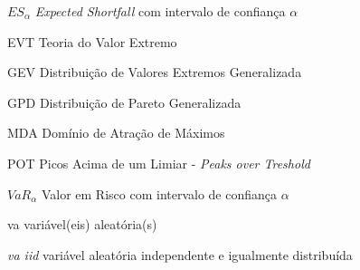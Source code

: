 
\frenchspacing

\pretextual



\imprimirfolhaderosto*

%

%

%

%

%

%

\listoffigures*
\cleardoublepage

\listoftables*
\cleardoublepage

\begin{siglas}
  \item[$ES_\alpha$] \emph{Expected Shortfall} com intervalo de confiança $\alpha$
  \item[EVT] Teoria do Valor Extremo
  \item[GEV] Distribuição de Valores Extremos Generalizada
  \item[GPD] Distribuição de Pareto Generalizada
  \item[MDA] Domínio de  Atração de Máximos
  \item[POT] Picos Acima de um Limiar - \emph{Peaks over Treshold}
  \item[$VaR_\alpha$] Valor em Risco com intervalo de confiança $\alpha$
  \item [va] variável(eis) aleatória(s)
  \item[\emph{va iid}] variável aleatória independente e igualmente distribuída
\end{siglas}

